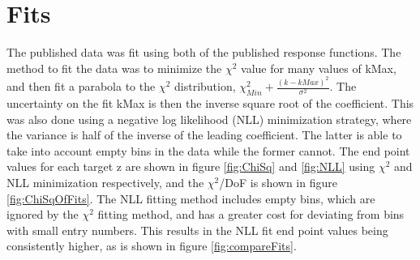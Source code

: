 
\section { Fits }
The published data was fit using both of the published response functions.
The method to fit the data was to minimize the $\chi^2$ value for many values
of kMax, and then fit a parabola to the $\chi^2$ distribution, 
$\chi^2_{Min} + \frac{(k-kMax)^2}{\sigma^2}$. The uncertainty on the fit kMax
is then the inverse square root of the coefficient. This was also done using
a negative log likelihood (NLL) minimization strategy, where the variance is half of
the inverse of the leading coefficient. The latter is able to take into account empty
bins in the data while the former cannot. The end point values for each target z 
are shown in figure \ref{fig:ChiSq} and \ref{fig:NLL} using $\chi^2$ and NLL minimization
respectively, and the $\chi^2$/DoF is shown in figure \ref{fig:ChiSqOfFits}. The NLL
fitting method includes empty bins, which are ignored by the $\chi^2$ fitting method,
and has a greater cost for deviating from bins with small entry numbers. This results
in the NLL fit end point values being consistently higher, as is shown in figure \ref{fig:compareFits}.

